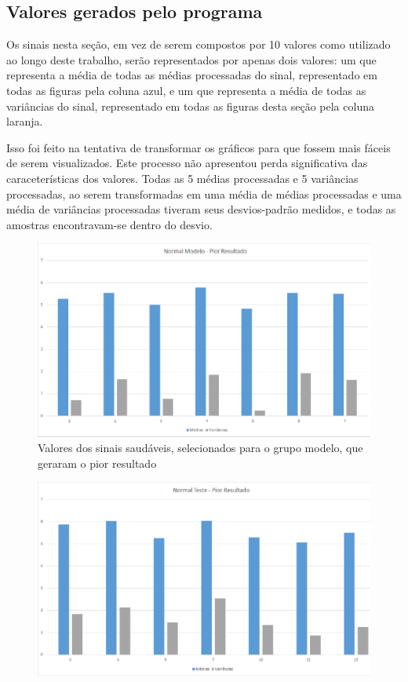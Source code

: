 \documentclass[a4paper,12pt,oneside]{report}
\begin{document}
\newpage
\begin{appendices}
\chapter{Valores gerados pelo programa} 
\hspace*{+15pt}Os sinais nesta se\c{c}\~{a}o, em vez de serem compostos por 10 valores como utilizado ao longo deste trabalho, ser\~{a}o representados por apenas dois valores: um que representa a m\'{e}dia de todas as m\'{e}dias processadas do sinal, representado em todas as figuras pela coluna azul, e um que representa a m\'{e}dia de todas as vari\^{a}ncias do sinal, representado em todas as figuras desta se\c{c}\~{a}o pela coluna laranja. 
\\
\par Isso foi feito na tentativa de transformar os gr\'{a}ficos para que fossem mais f\'{a}ceis de serem visualizados. Este processo n\~{a}o apresentou perda significativa das caraceter\'{i}sticas dos valores. Todas as 5 m\'{e}dias processadas e 5 vari\^{a}ncias processadas, ao serem transformadas em uma m\'{e}dia de m\'{e}dias processadas e uma m\'{e}dia de vari\^{a}ncias processadas tiveram seus desvios-padr\~{a}o medidos, e todas as amostras encontravam-se dentro do desvio. 
\begin{figure}
\centering
\includegraphics[width=0.70\hsize]{figuras_tcc/pior_resultado/normal_modelo_pior.eps}
\caption{Valores dos sinais saud\'{a}veis, selecionados para o grupo modelo, que geraram o pior resultado}
\label{fig:normal_modelo_pior}
\end{figure}
\begin{figure}
\centering
\includegraphics[width=0.70\hsize]{figuras_tcc/pior_resultado/normal_teste_pior.eps}

\end{figure}
\end{appendices}
\end{document}
